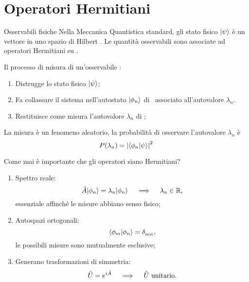 \section{Operatori Hermitiani}
\begin{frame}{Osservabili fisiche}
    Nella Meccanica Quantistica standard, gli stato fisico $\ket{\psi}$ è un vettore in uno spazio di Hilbert \mcH. Le quantità osservabili sono associate ad operatori Hermitiani su \mcH.

    \pause
    Il processo di misura di un'osservabile \hA :
    \begin{enumerate}[label=\mybullet]
        \pause
        \item Distrugge lo stato fisico $\ket{\psi}$;
        \pause
        \item Fa collassare il sistema nell'autostato $\ket{\phi_n}$ di \hA\ associato all'autovalore $\lambda_n$.
        \pause
        \item Restituisce come misura l'autovalore $\lambda_n$ di \hA;
    \end{enumerate}
    \pause
    La misura è un fenomeno aleatorio, la probabilità di osservare l'autovalore $\lambda_n$ è
    \begin{equation*}
        P\pqty{\lambda_n} = \abs{\braket{\phi_n}{\psi}}^2
    \end{equation*}
\end{frame}

\begin{frame}
    Come mai è importante che gli operatori siano Hermitiani?
    \begin{enumerate}[label=\mybullet]
        \pause
        \item Spettro reale:
            \begin{equation*}
                \hat{A}\!\ket{\phi_n} = \lambda_n\!\ket{\phi_n}
                \quad\implies\quad
                \lambda_n \in \mathbb{R}
                \text{,}
            \end{equation*}
            essenziale affinché le misure abbiano senso fisico;
        \pause
        \item Autospazi ortogonali:
            \begin{equation*}
                \braket{\phi_m}{\phi_n} = \tensor{\delta}{_m_n}\mycomma
            \end{equation*}
            le possibili misure sono mutualmente esclusive;
        \pause
        \item Generano trasformazioni di simmetria:
            \begin{equation*}
                \hat{U} = e^{i\hat{A}}
                \quad\implies\quad
                \hat{U}~\text{unitario}
                \text{.}
            \end{equation*}
    \end{enumerate}
\end{frame}

